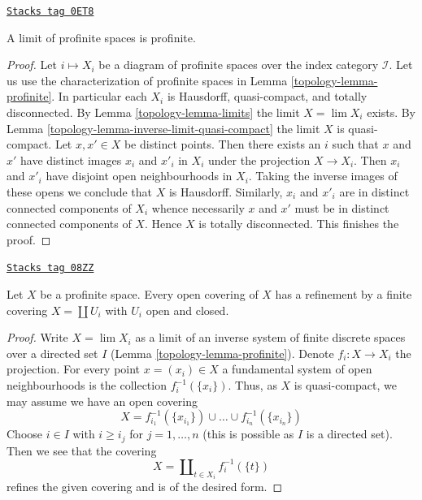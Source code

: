 \begin{lemma}
\label{topology-lemma-directed-inverse-limit-profinite}
\href{https://stacks.math.columbia.edu/tag/0ET8}{\texttt{Stacks tag 0ET8}}

A limit of profinite spaces is profinite.
\end{lemma}

\begin{proof}

Let $i \mapsto X_i$ be a diagram of profinite spaces
over the index category $\mathcal{I}$.
Let us use the characterization of profinite spaces in
Lemma \ref{topology-lemma-profinite}. In particular each $X_i$ is
Hausdorff, quasi-compact, and totally disconnected.
By Lemma \ref{topology-lemma-limits} the limit $X = \lim X_i$ exists.
By Lemma \ref{topology-lemma-inverse-limit-quasi-compact}
the limit $X$ is quasi-compact. Let $x, x' \in X$ be distinct points.
Then there exists an $i$ such that $x$ and $x'$
have distinct images $x_i$ and $x'_i$ in $X_i$
under the projection $X \to X_i$. Then $x_i$ and $x'_i$
have disjoint open neighbourhoods in $X_i$. Taking the
inverse images of these opens we conclude that $X$ is Hausdorff.
Similarly, $x_i$ and $x'_i$ are in distinct connected components
of $X_i$ whence necessarily $x$ and $x'$ must be in distinct
connected components of $X$. Hence $X$ is totally disconnected.
This finishes the proof.
\end{proof}

\begin{lemma}
\label{topology-lemma-profinite-refine-open-covering}
\href{https://stacks.math.columbia.edu/tag/08ZZ}{\texttt{Stacks tag 08ZZ}}

Let $X$ be a profinite space. Every open covering of $X$ has a refinement
by a finite covering $X = \coprod U_i$ with $U_i$ open and closed.
\end{lemma}

\begin{proof}

Write $X = \lim X_i$ as a limit of an inverse system of finite discrete
spaces over a directed set $I$ (Lemma \ref{topology-lemma-profinite}).
Denote $f_i : X \to X_i$ the projection.
For every point $x = (x_i) \in X$ a fundamental system of open neighbourhoods
is the collection $f_i^{-1}(\{x_i\})$. Thus, as $X$ is quasi-compact, we may
assume we have an open covering
$$
X = f_{i_1}^{-1}(\{x_{i_1}\}) \cup \ldots \cup f_{i_n}^{-1}(\{x_{i_n}\})
$$
Choose $i \in I$ with $i \geq i_j$ for $j = 1, \ldots, n$ (this is possible
as $I$ is a directed set). Then we see
that the covering
$$
X = \coprod\nolimits_{t \in X_i} f_i^{-1}(\{t\})
$$
refines the given covering and is of the desired form.
\end{proof}

